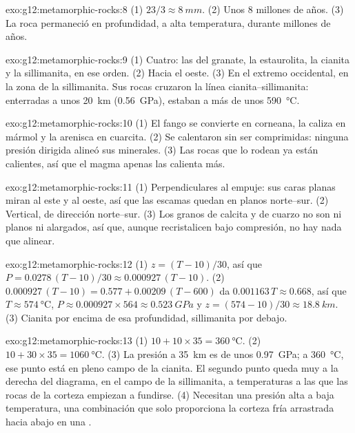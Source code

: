 \begin{solution}{exo:g12:metamorphic-rocks:8}
(1) $23/3 \approx \qty{8}{mm}$. (2) Unos 8 millones de años. (3) La roca
permaneció en profundidad, a alta temperatura, durante millones de años.
\end{solution}

\begin{solution}{exo:g12:metamorphic-rocks:9}
(1) Cuatro: las  del granate, la estaurolita, la cianita y la
sillimanita, en ese orden. (2) Hacia el oeste. (3) En el extremo occidental,
en la zona de la sillimanita. Sus rocas cruzaron la línea
cianita--sillimanita: enterradas a unos \qty{20}{km} (\qty{0.56}{GPa}),
estaban a más de unos \qty{590}{\celsius}.
\end{solution}

\begin{solution}{exo:g12:metamorphic-rocks:10}
(1) El fango se convierte en corneana, la caliza en mármol y la arenisca en
cuarcita. (2) Se calentaron sin ser comprimidas: ninguna presión dirigida
alineó sus minerales. (3) Las rocas que lo rodean ya están calientes, así que
el magma apenas las calienta más.
\end{solution}

\begin{solution}{exo:g12:metamorphic-rocks:11}
(1) Perpendiculares al empuje: sus caras planas miran al este y al oeste, así
que las escamas quedan en planos norte--sur. (2) Vertical, de dirección
norte--sur. (3) Los granos de calcita y de cuarzo no son ni planos ni
alargados, así que, aunque recristalicen bajo compresión, no hay nada que
alinear.
\end{solution}

\begin{solution}{exo:g12:metamorphic-rocks:12}
(1) $z = (T - 10)/30$, así que $P = 0.0278\,(T - 10)/30 \approx
0.000927\,(T - 10)$. (2) $0.000927\,(T - 10) = 0.577 + 0.00209\,(T - 600)$
da $0.001163\,T \approx 0.668$, así que $T \approx \qty{574}{\celsius}$, $P
\approx 0.000927 \times 564 \approx \qty{0.523}{GPa}$ y $z = (574 - 10)/30
\approx \qty{18.8}{km}$. (3) Cianita por encima de esa profundidad,
sillimanita por debajo.
\end{solution}

\begin{solution}{exo:g12:metamorphic-rocks:13}
(1) $10 + 10 \times 35 = \qty{360}{\celsius}$. (2) $10 + 30 \times 35 =
\qty{1060}{\celsius}$. (3) La presión a \qty{35}{km} es de unos
\qty{0.97}{GPa}; a \qty{360}{\celsius}, ese punto está en pleno campo de la
cianita. El segundo punto queda muy a la derecha del diagrama, en el campo de
la sillimanita, a temperaturas a las que las rocas de la corteza empiezan a
fundirse. (4) Necesitan una presión alta a baja temperatura, una combinación
que solo proporciona la corteza fría arrastrada hacia abajo en una .
\end{solution}

